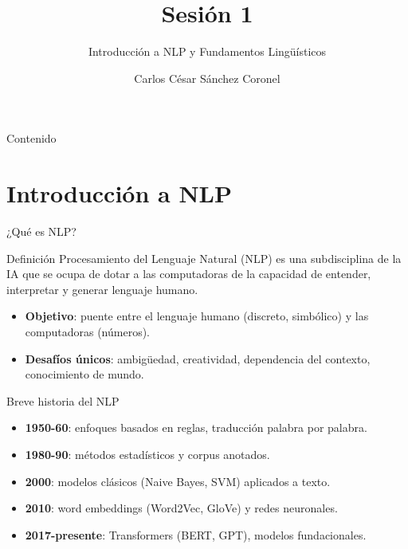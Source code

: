 \documentclass[aspectratio=169, 10pt, xcolor=table]{beamer}
\title[SESIÓN 1 NLP]{\textbf{Sesión 1}}
\subtitle{Introducción a NLP y Fundamentos Lingüísticos}
\author[Prof. C. Sánchez]{Carlos César Sánchez Coronel}
\institute{\textbf{NLP}}
\date{}
\begin{document}
\begin{frame}
    \titlepage
\end{frame}

\begin{frame}{Contenido}
    \tableofcontents
\end{frame}

\section{Introducción a NLP}

\begin{frame}{¿Qué es NLP?}
    \begin{block}{Definición}
        Procesamiento del Lenguaje Natural (NLP) es una subdisciplina de la IA que se ocupa de dotar a las computadoras de la capacidad de entender, interpretar y generar lenguaje humano.
    \end{block}
    \begin{itemize}
        \item \textbf{Objetivo}: puente entre el lenguaje humano (discreto, simbólico) y las computadoras (números).
        \item \textbf{Desafíos únicos}: ambigüedad, creatividad, dependencia del contexto, conocimiento de mundo.
    \end{itemize}
\end{frame}

\begin{frame}{Breve historia del NLP}
    \begin{itemize}
        \item \textbf{1950-60}: enfoques basados en reglas, traducción palabra por palabra.
        \item \textbf{1980-90}: métodos estadísticos y corpus anotados.
        \item \textbf{2000}: modelos clásicos (Naive Bayes, SVM) aplicados a texto.
        \item \textbf{2010}: word embeddings (Word2Vec, GloVe) y redes neuronales.
        \item \textbf{2017-presente}: Transformers (BERT, GPT), modelos fundacionales.
    \end{itemize}
\end{frame}
\end{document}
